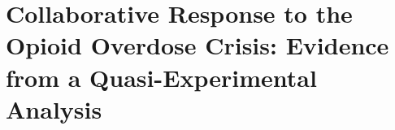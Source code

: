 \chapter{Collaborative Response to the Opioid Overdose Crisis: Evidence from a Quasi-Experimental Analysis}